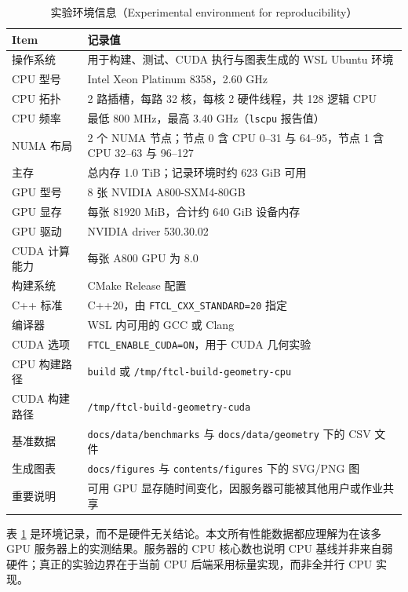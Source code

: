 \begin{table}[H]
\centering
\caption{实验环境信息（Experimental environment for reproducibility）}
\label{tab:environment}
\begin{tabularx}{\textwidth}{lX}
\toprule
Item & 记录值 \\
\midrule
操作系统 & 用于构建、测试、CUDA 执行与图表生成的 WSL Ubuntu 环境 \\
CPU 型号 & Intel Xeon Platinum 8358，2.60 GHz \\
CPU 拓扑 & 2 路插槽，每路 32 核，每核 2 硬件线程，共 128 逻辑 CPU \\
CPU 频率 & 最低 800 MHz，最高 3.40 GHz（\texttt{lscpu} 报告值） \\
NUMA 布局 & 2 个 NUMA 节点；节点 0 含 CPU 0--31 与 64--95，节点 1 含 CPU 32--63 与 96--127 \\
主存 & 总内存 1.0 TiB；记录环境时约 623 GiB 可用 \\
GPU 型号 & 8 张 NVIDIA A800-SXM4-80GB \\
GPU 显存 & 每张 81920 MiB，合计约 640 GiB 设备内存 \\
GPU 驱动 & NVIDIA driver 530.30.02 \\
CUDA 计算能力 & 每张 A800 GPU 为 8.0 \\
构建系统 & CMake Release 配置 \\
C++ 标准 & C++20，由 \texttt{FTCL\_CXX\_STANDARD=20} 指定 \\
编译器 & WSL 内可用的 GCC 或 Clang \\
CUDA 选项 & \texttt{FTCL\_ENABLE\_CUDA=ON}，用于 CUDA 几何实验 \\
CPU 构建路径 & \texttt{build} 或 \texttt{/tmp/ftcl-build-geometry-cpu} \\
CUDA 构建路径 & \texttt{/tmp/ftcl-build-geometry-cuda} \\
基准数据 & \texttt{docs/data/benchmarks} 与 \texttt{docs/data/geometry} 下的 CSV 文件 \\
生成图表 & \texttt{docs/figures} 与 \texttt{contents/figures} 下的 SVG/PNG 图 \\
重要说明 & 可用 GPU 显存随时间变化，因服务器可能被其他用户或作业共享 \\
\bottomrule
\end{tabularx}
\end{table}

表 \ref{tab:environment} 是环境记录，而不是硬件无关结论。本文所有性能数据都应理解为在该多 GPU 服务器上的实测结果。服务器的 CPU 核心数也说明 CPU 基线并非来自弱硬件；真正的实验边界在于当前 CPU 后端采用标量实现，而非全并行 CPU 实现。

